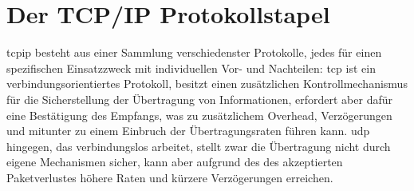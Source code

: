 
%


\section{Der TCP/IP Protokollstapel}
\label{chapter:grundlagen:tcpip}

\gls{tcpip} besteht aus einer Sammlung verschiedenster Protokolle, jedes für einen spezifischen Einsatzzweck mit individuellen Vor- und Nachteilen: \gls{tcp} \zB ist ein verbindungsorientiertes Protokoll, besitzt einen zusätzlichen Kontrollmechanismus für die Sicherstellung der Übertragung von Informationen, erfordert aber dafür eine Bestätigung des Empfangs, was zu zusätzlichem Overhead, Verzögerungen und mitunter zu einem Einbruch der Übertragungsraten führen kann. \gls{udp} hingegen, das verbindungslos arbeitet, stellt zwar die Übertragung nicht durch eigene Mechanismen sicher, kann aber aufgrund des des akzeptierten Paketverlustes höhere Raten und kürzere Verzögerungen erreichen. %

